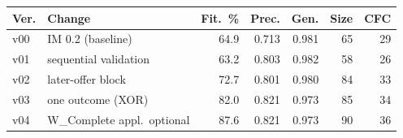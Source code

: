 \begin{tabular}{@{}llrrrrr@{}}
\toprule
Ver. & Change & Fit.\ \% & Prec. & Gen. & Size & CFC \\
\midrule
v00 & IM 0.2 (baseline) & 64.9 & 0.713 & 0.981 & 65 & 29 \\
v01 & sequential validation & 63.2 & 0.803 & 0.982 & 58 & 26 \\
v02 & later-offer block & 72.7 & 0.801 & 0.980 & 84 & 33 \\
v03 & one outcome (XOR) & 82.0 & 0.821 & 0.973 & 85 & 34 \\
v04 & W\_Complete appl.\ optional & 87.6 & 0.821 & 0.973 & 90 & 36 \\
\bottomrule
\end{tabular}
